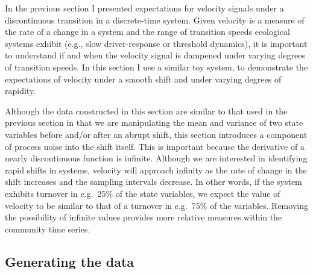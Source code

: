 \documentclass[12pt,twoside,openany]{reedthesis}
\begin{document}
In the previous section I presented expectations for velocity signals under a discontinuous transition in a discrete-time system. Given velocity is a measure of the rate of a change in a system and the range of transition speeds ecological systems exhibit (e.g., slow driver-response or threshold dynamics), it is important to understand if and when the velocity signal is dampened under varying degrees of transition speeds. In this section I use a similar toy system, to demonstrate the expectations of velocity under a smooth shift and under varying degrees of rapidity.

Although the data constructed in this section are similar to that used in the previous section in that we are manipulating the mean and variance of two state variables before and/or after an abrupt shift, this section introduces a component of process noise into the shift itself. This is important because the derivative of a nearly discontinuous function is infinite. Although we are interested in identifying rapid shifts in systems, velocity will approach infinity as the rate of change in the shift increases and the sampling intervals decrease. In other words, if the system exhibits turnover in e.g.~\(25\%\) of the state variables, we expect the value of velocity to be similar to that of a turnover in e.g.~\(75\%\) of the variables. Removing the possibility of infinite values provides more relative measures within the community time series.

\hypertarget{generating-the-data}{%
\subsection{Generating the data}\label{generating-the-data}}
\end{document}
